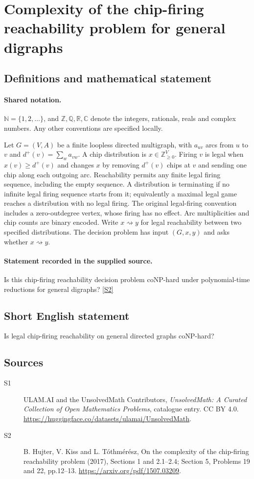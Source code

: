 \documentclass[11pt]{article}
\newcommand{\sref}[2]{\hyperlink{source:#1:#2}{[S#2]}}
\begin{document}
\section{Complexity of the chip-firing reachability problem for general digraphs}\label{statement}

\subsection{Definitions and mathematical statement}

\paragraph{Shared notation.}$\mathbb N=\{1,2,\ldots\}$, and $\mathbb Z,\mathbb Q,\mathbb R,\mathbb C$ denote the integers, rationals, reals and complex numbers. Any other conventions are specified locally.


Let $G=(V,A)$ be a finite loopless directed multigraph, with $a_{uv}$ arcs from $u$ to $v$ and $d^+(v)=\sum_w a_{vw}$. A chip distribution is $x\in\mathbb Z_{\ge0}^{V}$. Firing $v$ is legal when $x(v)\ge d^+(v)$ and changes $x$ by removing $d^+(v)$ chips at $v$ and sending one chip along each outgoing arc. Reachability permits any finite legal firing sequence, including the empty sequence. A distribution is terminating if no infinite legal firing sequence starts from it; equivalently a maximal legal game reaches a distribution with no legal firing. The original legal-firing convention includes a zero-outdegree vertex, whose firing has no effect. Arc multiplicities and chip counts are binary encoded. Write $x\rightsquigarrow y$ for legal reachability between two specified distributions. The decision problem has input $(G,x,y)$ and asks whether $x\rightsquigarrow y$.
\paragraph{Statement recorded in the supplied source.}
Is this chip-firing reachability decision problem coNP-hard under polynomial-time reductions for general digraphs? \sref{statement}{2}
\subsection{Short English statement}
Is legal chip-firing reachability on general directed graphs coNP-hard?
\subsection{Sources}
\begin{description}
\item[\hypertarget{source:statement:1}{S1}] ULAM.AI and the UnsolvedMath Contributors, \emph{UnsolvedMath: A Curated Collection of Open Mathematics Problems}, catalogue entry. CC BY 4.0. \url{https://huggingface.co/datasets/ulamai/UnsolvedMath}.
\item[\hypertarget{source:statement:2}{S2}] B. Hujter, V. Kiss and L. Tóthmérész, On the complexity of the chip-firing reachability problem (2017), Sections 1 and 2.1--2.4; Section 5, Problems 19 and 22, pp.12--13. \url{https://arxiv.org/pdf/1507.03209}.
\end{description}
\label{end:statement}
\end{document}
